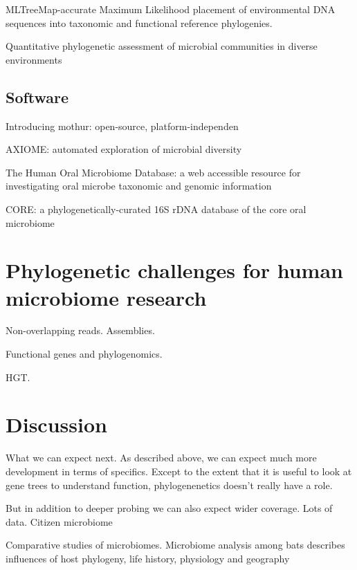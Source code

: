 \documentclass{amsart}
\begin{document}
\cite{stark2010mltreemap}
{{MLTreeMap}-accurate Maximum Likelihood placement of environmental DNA sequences into taxonomic and functional reference phylogenies.}

\cite{vonMeringEaQuantitative08}
{Quantitative phylogenetic assessment of microbial communities in diverse environments}

\subsection{Software}
\cite{caporaso2010qiime}

\cite{schloss2009introducing}
Introducing mothur: open-source, platform-independen

\cite{lynch2013axiome}
AXIOME: automated exploration of microbial diversity

\cite{chen2010human}
The Human Oral Microbiome Database: a web accessible resource for investigating oral microbe taxonomic and genomic information

\cite{griffen2011core}
CORE: a phylogenetically-curated 16S rDNA database of the core oral microbiome

\cite{srinivasan2012bacterial}


\section{Phylogenetic challenges for human microbiome research}

Non-overlapping reads.
Assemblies.

Functional genes and phylogenomics.

HGT.



\section{Discussion}
What we can expect next.
As described above, we can expect much more development in terms of specifics.
\cite{hooper2012interactions}
Except to the extent that it is useful to look at gene trees to understand function, phylogenenetics doesn't really have a role.

But in addition to deeper probing we can also expect wider coverage.
Lots of data.
Citizen microbiome

Comparative studies of microbiomes.
\cite{phillips2012microbiome}
Microbiome analysis among bats describes influences of host phylogeny, life history, physiology and geography
\end{document}
